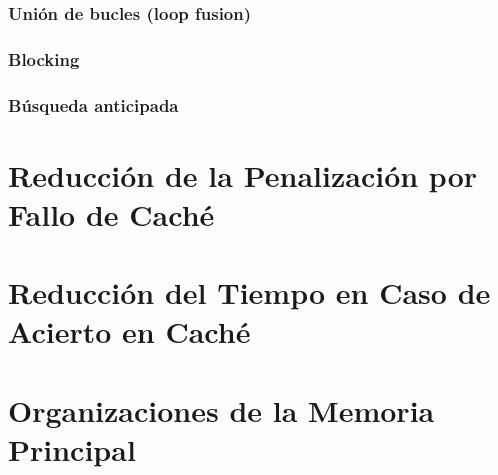 \documentclass[12pt,onecolumn]{memoir}
\begin{document}
\subsubsection{Unión de bucles (loop fusion)}

\subsubsection{Blocking}

\subsubsection{Búsqueda anticipada}


\section{Reducción de la Penalización por Fallo de Caché}

\section{Reducción del Tiempo en Caso de Acierto en Caché}

\section{Organizaciones de la Memoria Principal}

 
 
\end{document}
